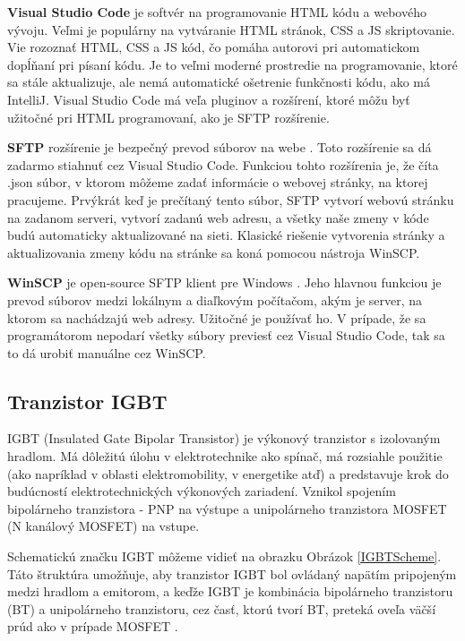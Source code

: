 \noindent \textbf{Visual Studio Code} je softvér na programovanie \cite{c9} HTML kódu a webového vývoju. Veľmi je populárny na vytváranie HTML stránok, CSS a JS skriptovanie. Vie rozoznať HTML, CSS a JS kód, čo pomáha autorovi pri automatickom dopĺňaní pri písaní kódu. Je to veľmi moderné prostredie na programovanie, ktoré sa stále aktualizuje, ale nemá automatické ošetrenie funkčnosti kódu, ako má IntelliJ. Visual Studio Code má veľa pluginov a rozšírení, ktoré môžu byť užitočné pri HTML programovaní, ako je SFTP rozšírenie.

\noindent 
\textbf {\acrshort{SFTP}} rozšírenie je bezpečný prevod súborov na webe \cite{c10}. Toto rozšírenie sa dá zadarmo stiahnuť cez Visual Studio Code. Funkciou tohto rozšírenia je, že číta .json súbor, v ktorom môžeme zadať informácie o webovej stránky, na ktorej pracujeme. Prvýkrát keď je prečítaný tento súbor, SFTP vytvorí webovú stránku na zadanom serveri, vytvorí zadanú web adresu, a všetky naše zmeny v kóde budú automaticky aktualizované na sieti. Klasické riešenie vytvorenia stránky a aktualizovania zmeny kódu na stránke sa koná pomocou nástroja \acrshort{WinSCP}. 

\noindent
\textbf {\acrshort {WinSCP}} je open-source \acrshort{SFTP} klient pre Windows \cite{c11}. Jeho hlavnou funkciou je prevod súborov medzi lokálnym a diaľkovým počítačom, akým je server, na ktorom sa nachádzajú web adresy.  Užitočné je používať ho. V prípade, že sa programátorom nepodarí všetky súbory previesť cez Visual Studio Code, tak sa to dá urobiť manuálne cez WinSCP.

\subsection{Tranzistor IGBT}
\noindent \acrshort{IGBT} (Insulated Gate Bipolar Transistor) je výkonový tranzistor s izolovaným hradlom. Má dôležitú úlohu v elektrotechnike ako spínač, má rozsiahle použitie (ako napríklad v oblasti elektromobility, v energetike atď) a predstavuje krok do budúcností elektrotechnických výkonových zariadení. Vznikol spojením bipolárneho tranzistora - PNP na výstupe a unipolárneho tranzistora \acrshort{MOSFET} (N kanálový \acrshort{MOSFET}) na vstupe.

Schematickú značku \acrshort{IGBT} môžeme vidieť na obrazku Obrázok \ref{IGBTScheme}. Táto štruktúra umožňuje, aby tranzistor \acrshort{IGBT} bol ovládaný napätím pripojeným medzi hradlom a emitorom, a keďže \acrshort{IGBT} je kombinácia bipolárneho tranzistoru (\acrshort{BT}) a unipolárneho tranzistoru, cez časť, ktorú tvorí BT, preteká oveľa väčší prúd ako v prípade \acrshort{MOSFET} \cite{c22}.

